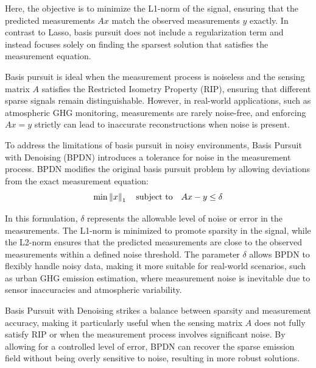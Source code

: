 Here, the objective is to minimize the L1-norm of the signal, ensuring that the predicted measurements $A x$ match the observed measurements $y$ exactly.
In contrast to Lasso, basis pursuit does not include a regularization term and instead focuses solely on finding the sparsest solution that satisfies the measurement equation.

Basis pursuit is ideal when the measurement process is noiseless and the sensing matrix $A$ satisfies the Restricted Isometry Property (RIP), ensuring that different sparse signals remain distinguishable.
However, in real-world applications, such as atmospheric GHG monitoring, measurements are rarely noise-free, and enforcing $Ax = y$ strictly can lead to inaccurate reconstructions when noise is present.

To address the limitations of basis pursuit in noisy environments, Basis Pursuit with Denoising (BPDN) introduces a tolerance for noise in the measurement process.
BPDN modifies the original basis pursuit problem by allowing deviations from the exact measurement equation:
\begin{equation}
    \min \left\lVert x\right\rVert_1 \quad \text{subject to} \quad  Ax -y \le \delta
\end{equation}

In this formulation, $\delta$ represents the allowable level of noise or error in the measurements.
The L1-norm is minimized to promote sparsity in the signal, while the L2-norm ensures that the predicted measurements are close to the observed measurements within a defined noise threshold.
The parameter $\delta$ allows BPDN to flexibly handle noisy data, making it more suitable for real-world scenarios, such as urban GHG emission estimation, where measurement noise is inevitable due to sensor inaccuracies and atmospheric variability.

Basis Pursuit with Denoising strikes a balance between sparsity and measurement accuracy, making it particularly useful when the sensing matrix $A$ does not fully satisfy RIP or when the measurement process involves significant noise.
By allowing for a controlled level of error, BPDN can recover the sparse emission field without being overly sensitive to noise, resulting in more robust solutions.



